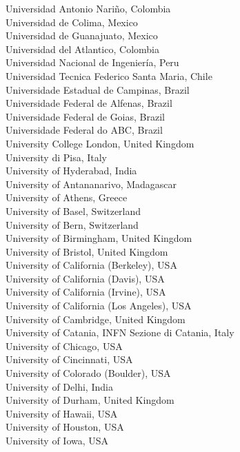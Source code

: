 \begin{center}
Universidad Antonio Nariño, Colombia \\
Universidad de Colima, Mexico \\
Universidad de Guanajuato, Mexico \\
Universidad del Atlantico, Colombia \\
Universidad Nacional de Ingeniería, Peru \\
Universidad Tecnica Federico Santa Maria, Chile \\
Universidade Estadual de Campinas, Brazil \\
Universidade Federal de Alfenas, Brazil \\
Universidade Federal de Goias, Brazil \\
Universidade Federal do ABC, Brazil \\
University College London, United Kingdom \\
University di Pisa, Italy \\
University of  Hyderabad, India \\
University of Antananarivo, Madagascar \\
University of Athens, Greece \\
University of Basel, Switzerland \\
University of Bern, Switzerland \\
University of Birmingham, United Kingdom \\
University of Bristol, United Kingdom \\
University of California (Berkeley), USA \\
University of California (Davis), USA \\
University of California (Irvine), USA \\
University of California (Los Angeles), USA \\
University of Cambridge, United Kingdom \\
University of Catania, INFN Sezione di Catania, Italy \\
University of Chicago, USA \\
University of Cincinnati, USA \\
University of Colorado (Boulder), USA \\
University of Delhi, India \\
University of Durham, United Kingdom \\
University of Hawaii, USA \\
University of Houston, USA \\
University of Iowa, USA \\

\end{center}
